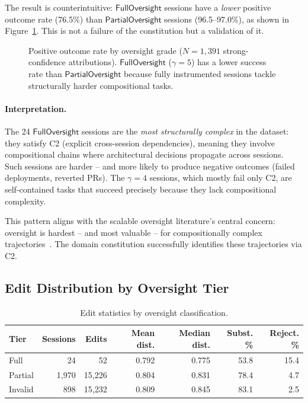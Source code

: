 \documentclass[11pt]{article}
\begin{document}
The result is counterintuitive: $\mathsf{FullOversight}$ sessions have a \emph{lower} positive outcome rate (76.5\%) than $\mathsf{PartialOversight}$ sessions (96.5--97.0\%), as shown in Figure~\ref{fig:outcome-rates}.
This is not a failure of the constitution but a validation of it.

\begin{figure}[t]
\centering

\caption{Positive outcome rate by oversight grade ($N = 1{,}391$ strong-confidence attributions). $\mathsf{FullOversight}$ ($\gamma=5$) has a lower success rate than $\mathsf{PartialOversight}$ because fully instrumented sessions tackle structurally harder compositional tasks.}
\label{fig:outcome-rates}
\end{figure}

\paragraph{Interpretation.}
The 24 $\mathsf{FullOversight}$ sessions are the \emph{most structurally complex} in the dataset: they satisfy C2 (explicit cross-session dependencies), meaning they involve compositional chains where architectural decisions propagate across sessions.
Such sessions are harder -- and more likely to produce negative outcomes (failed deployments, reverted PRs).
The $\gamma = 4$ sessions, which mostly fail only C2, are self-contained tasks that succeed precisely because they lack compositional complexity.

This pattern aligns with the scalable oversight literature's central concern: oversight is hardest -- and most valuable -- for compositionally complex trajectories~\citep{bowman2022measuring}.
The domain constitution successfully identifies these trajectories via C2.

\subsection{Edit Distribution by Oversight Tier}
\label{sec:edit-by-tier}

\begin{table}[ht]
\centering
\caption{Edit statistics by oversight classification.}
\label{tab:edit-by-tier}
\begin{tabular}{@{}lrrrrrr@{}}
\toprule
\textbf{Tier} & \textbf{Sessions} & \textbf{Edits} & \textbf{Mean dist.} & \textbf{Median dist.} & \textbf{Subst. \%} & \textbf{Reject. \%} \\
\midrule
Full    &    24 &     52 & 0.792 & 0.775 & 53.8 & 15.4 \\
Partial & 1{,}970 & 15{,}226 & 0.804 & 0.831 & 78.4 & 4.7 \\
Invalid &   898 & 15{,}232 & 0.809 & 0.845 & 83.1 & 2.5 \\
\bottomrule
\end{tabular}
\end{table}
\end{document}
